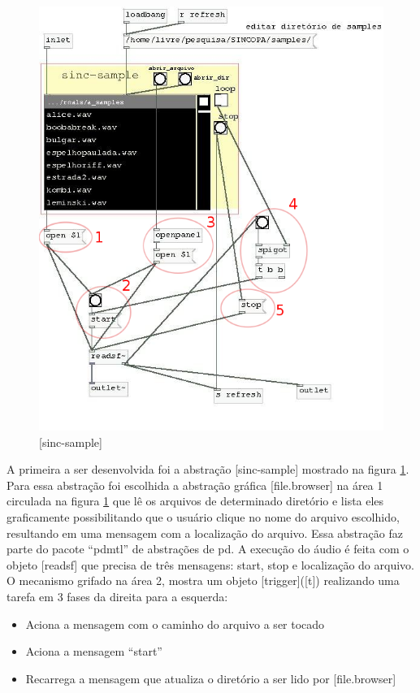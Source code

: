 \documentclass{ppgmus}
\begin{document}
\begin{figure}[!htt]
\includegraphics[scale=.5]{sinc-sample}
\caption{[sinc-sample]}
\label{[sinc-sample]}
\end{figure}



A primeira a ser desenvolvida foi a abstração [sinc-sample] mostrado na figura
\ref{[sinc-sample]}. Para essa abstração foi escolhida a abstração gráfica 
[file.browser] 
na área 1 circulada na figura \ref{[sinc-sample]} que lê os arquivos de determinado
 diretório e lista eles graficamente possibilitando que
o usuário clique no nome do arquivo escolhido, resultando em uma mensagem com a 
localização
do arquivo. Essa abstração faz parte do pacote ``pdmtl'' de abstrações de pd.
A execução do áudio é feita com o objeto [readsf\texttildelow] que precisa de três mensagens:
start, stop e localização do arquivo. O mecanismo grifado na área 2, mostra
um objeto [trigger]([t]) realizando uma tarefa em 3 fases da direita para a esquerda:
\begin{itemize}
 \item Aciona a mensagem com o caminho do arquivo a ser tocado
 \item Aciona a mensagem ``start''
 \item Recarrega a mensagem que atualiza o diretório a ser lido por [file.browser]
\end{itemize}
\end{document}

